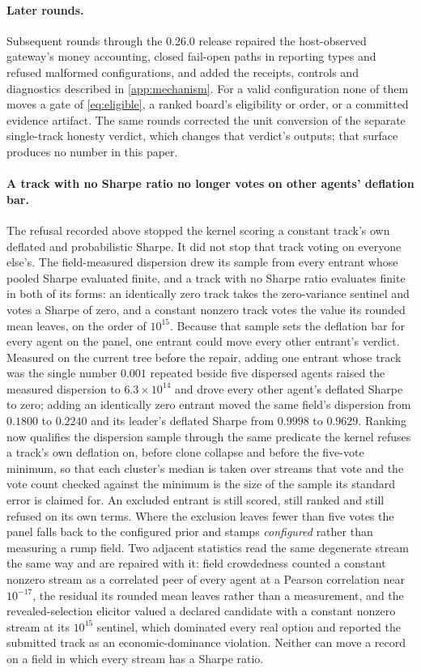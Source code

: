 \paragraph{Later rounds.} Subsequent rounds through the 0.26.0 release repaired the host-observed gateway's money accounting, closed fail-open paths in reporting types and refused malformed configurations, and added the receipts, controls and diagnostics described in \cref{app:mechanism}. For a valid configuration none of them moves a gate of \cref{eq:eligible}, a ranked board's eligibility or order, or a committed evidence artifact. The same rounds corrected the unit conversion of the separate single-track honesty verdict, which changes that verdict's outputs; that surface produces no number in this paper.

\paragraph{A track with no Sharpe ratio no longer votes on other agents' deflation bar.} The refusal recorded above stopped the kernel scoring a constant track's own deflated and probabilistic Sharpe. It did not stop that track voting on everyone else's. The field-measured dispersion drew its sample from every entrant whose pooled Sharpe evaluated finite, and a track with no Sharpe ratio evaluates finite in both of its forms: an identically zero track takes the zero-variance sentinel and votes a Sharpe of zero, and a constant nonzero track votes the value its rounded mean leaves, on the order of $10^{15}$. Because that sample sets the deflation bar for every agent on the panel, one entrant could move every other entrant's verdict. Measured on the current tree before the repair, adding one entrant whose track was the single number $0.001$ repeated beside five dispersed agents raised the measured dispersion to $6.3\times10^{14}$ and drove every other agent's deflated Sharpe to zero; adding an identically zero entrant moved the same field's dispersion from $0.1800$ to $0.2240$ and its leader's deflated Sharpe from $0.9998$ to $0.9629$. Ranking now qualifies the dispersion sample through the same predicate the kernel refuses a track's own deflation on, before clone collapse and before the five-vote minimum, so that each cluster's median is taken over streams that vote and the vote count checked against the minimum is the size of the sample its standard error is claimed for. An excluded entrant is still scored, still ranked and still refused on its own terms. Where the exclusion leaves fewer than five votes the panel falls back to the configured prior and stamps \emph{configured} rather than measuring a rump field. Two adjacent statistics read the same degenerate stream the same way and are repaired with it: field crowdedness counted a constant nonzero stream as a correlated peer of every agent at a Pearson correlation near $10^{-17}$, the residual its rounded mean leaves rather than a measurement, and the revealed-selection elicitor valued a declared candidate with a constant nonzero stream at its $10^{15}$ sentinel, which dominated every real option and reported the submitted track as an economic-dominance violation. Neither can move a record on a field in which every stream has a Sharpe ratio.

